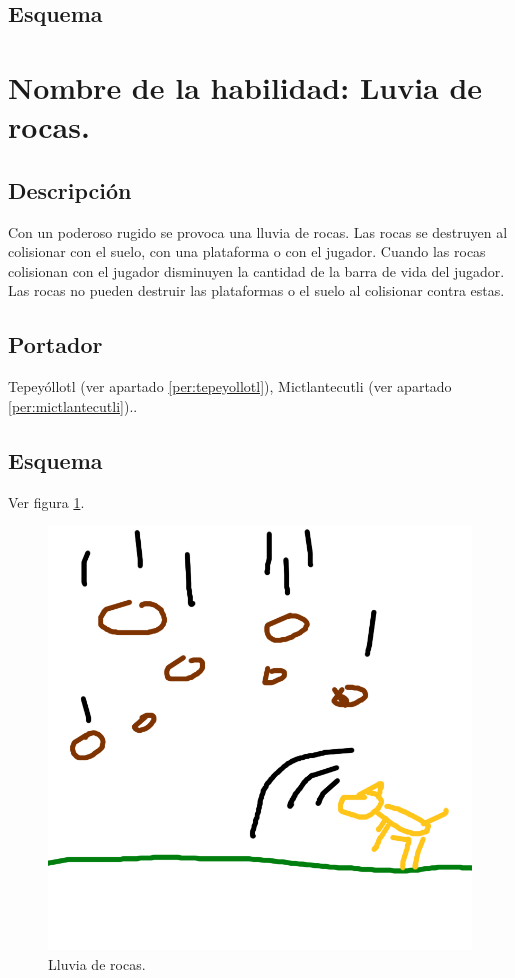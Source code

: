 \subsection{Esquema}

\section{Nombre de la habilidad: Luvia de rocas.} \label{hab.LLuviaRocas}
\subsection{Descripción}
Con un poderoso rugido se provoca una lluvia de rocas. Las rocas se destruyen al colisionar con el suelo, con una plataforma o con el jugador. Cuando las rocas colisionan con el jugador disminuyen la cantidad de la barra de vida del jugador. Las rocas no pueden destruir las plataformas o el suelo al colisionar contra estas.
\subsection{Portador}
Tepeyóllotl (ver apartado \ref{per:tepeyollotl}), Mictlantecutli (ver apartado \ref{per:mictlantecutli})..
\subsection{Esquema}
			Ver figura \ref{fig:lluviaR}.
			\begin{figure}
				\centering
				\includegraphics[height=0.2 \textheight]{Imagenes/lluviaR}
				\caption{Lluvia de rocas.}
				\label{fig:lluviaR}
			\end{figure}
			

